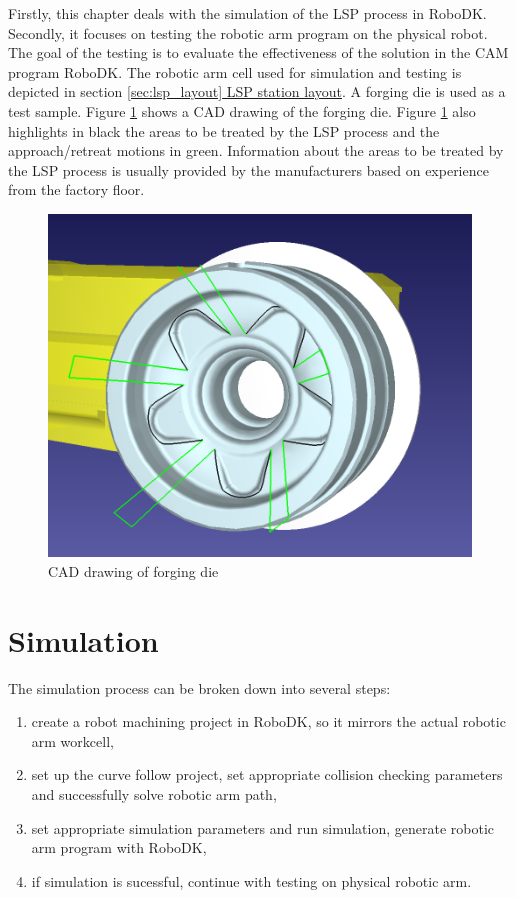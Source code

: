 \label{chap:testing}

Firstly, this chapter deals with the simulation of the LSP process in RoboDK. Secondly, it focuses on testing the robotic arm program on the physical robot. The goal of the testing is to evaluate the effectiveness of the solution in the CAM program RoboDK. The robotic arm cell used for simulation and testing is depicted in section \hyperref[sec:lsp_layout]{\ref{sec:lsp_layout} LSP station layout}. A forging die is used as a test sample. Figure \ref{fig:cad} shows a CAD drawing of the forging die. Figure \ref{fig:cad} also highlights in black the areas to be treated by the LSP process and the approach/retreat motions in green. Information about the areas to be treated by the LSP process is usually provided by the manufacturers based on experience from the factory floor.

\begin{figure}[h]
    \centering
    \includegraphics[width=0.8\linewidth]{img/cad.PNG}
    \caption{CAD drawing of forging die}
    \label{fig:cad}
\end{figure}

\section{Simulation}

The simulation process can be broken down into several steps:

\begin{enumerate}

\item create a robot machining project in RoboDK, so it mirrors the actual robotic arm workcell, 

\item set up the curve follow project, set appropriate collision checking parameters and successfully solve robotic arm path,

\item set appropriate simulation parameters and run simulation,
generate robotic arm program with RoboDK,

\item if simulation is sucessful, continue with testing on physical robotic arm.

\end{enumerate}

